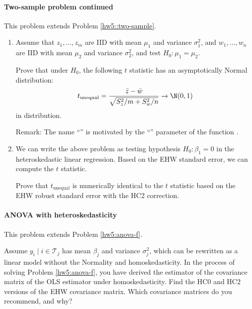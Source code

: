 \paragraph{Two-sample problem continued}\label{hw08::twosample-ehw}

This problem extends Problem \ref{hw5::two-sample}. 

\begin{enumerate}
\item Assume that $z_{1},\ldots,z_{m}$ are IID with mean $\mu_{1}$ and
variance $\sigma_{1}^{2}$, and $w_{1},\ldots,w_{n}$ are IID with
mean $\mu_{2}$ and variance $\sigma_{2}^{2}$, and test
$H_0: \mu_{1}=\mu_{2}$. 

Prove that under $H_0$, the following
$t$ statistic has an asymptotically Normal distribution:
\[
t_{\text{unequal}}=\frac{\bar{z}-\bar{w}}{\sqrt{S_{z}^{2}/m+S_{w}^{2}/n}}\rightarrow \N(0,1)
\]
in distribution. 

Remark: 
The name  ``'' is motivated by the ``''
parameter of the  function .

\item We can write the above problem as testing hypothesis $H_{0}:\beta_{1}=0$ in the heteroskedastic linear regression. Based on the EHW standard error, we can compute the $t$ statistic.

Prove that $t_{\text{unequal}}$ is numerically identical to the $t$ statistic based on the EHW robust standard error with the HC2 correction.
\end{enumerate}


\paragraph{ANOVA with heteroskedasticity}\label{hw8::anova-ols-hc02}

This problem extends Problem \ref{hw5:anova-f}. 



Assume $y_i \mid i \in \mathcal{T}_j $ has mean $\beta_j$ and variance $\sigma_j^2$, which can be rewritten as a linear model without the Normality and homoskedasticity. In the process of solving Problem \ref{hw5:anova-f}, you have derived the estimator of the covariance matrix of the OLS estimator under homoskedasticity. Find the  HC0 and HC2 versions of the EHW covariance matrix. Which covariance matrices do you recommend, and why? 

 


